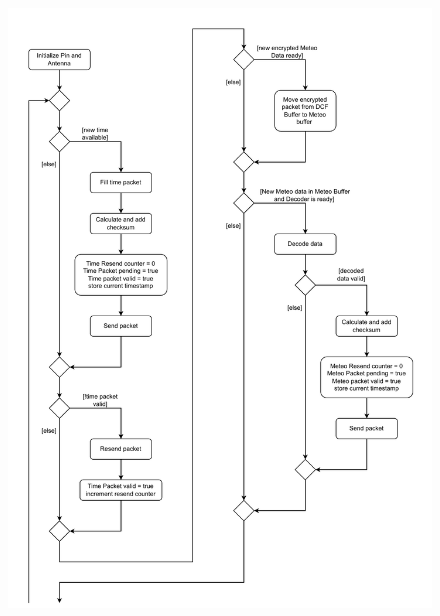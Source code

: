 \documentclass[a4paper,11pt]{article}
\begin{document}
\begin{figure}[H]
  \centering
  \includegraphics[scale=0.75, page=2]{Ablauf extern.pdf}
\end{figure}
\end{document}
